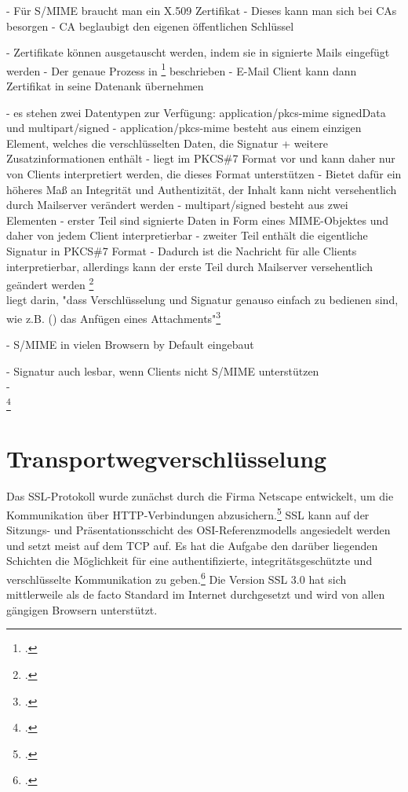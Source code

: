 \documentclass  [paper=a4,
				fontsize=12pt,
				listof=totoc,
				bibliography=totoc
				]{scrreprt}
\begin{document}
				- Für S/MIME braucht man ein X.509 Zertifikat
				- Dieses kann man sich bei CAs besorgen
				- CA beglaubigt den eigenen öffentlichen Schlüssel
				
				- Zertifikate können ausgetauscht werden, indem sie in signierte Mails eingefügt werden
				- Der genaue Prozess in 	\footcite[][S. 65 ff.]{Schwenk} beschrieben
				- E-Mail Client kann dann Zertifikat in seine Datenank übernehmen
				
				- es stehen zwei Datentypen zur Verfügung: application/pkcs-mime signedData und multipart/signed
				- application/pkcs-mime besteht aus einem einzigen Element, welches die verschlüsselten Daten, die Signatur + weitere Zusatzinformationen enthält
				- liegt im PKCS\#7 Format vor und kann daher nur von Clients interpretiert werden, die dieses Format unterstützen
				- Bietet dafür ein höheres Maß an Integrität und Authentizität, der Inhalt kann nicht versehentlich durch Mailserver verändert werden
				- multipart/signed besteht aus zwei Elementen
				- erster Teil sind signierte Daten in Form eines MIME-Objektes und daher von jedem Client interpretierbar
				- zweiter Teil enthält die eigentliche Signatur in PKCS\#7 Format
				- Dadurch ist die Nachricht für alle Clients interpretierbar, allerdings kann der erste Teil durch Mailserver versehentlich geändert werden
				\footcite[][S. 65]{Schwenk}
				\medskip\\											
				liegt darin, "dass Verschlüsselung und Signatur genauso einfach zu bedienen sind, wie z.B. () das Anfügen eines Attachments"\footcite[][S. 61]{Schwenk}
				
				- S/MIME in vielen Browsern by Default eingebaut
				
				- Signatur auch lesbar, wenn Clients nicht S/MIME unterstützen\medskip\\	
				- \medskip\\
						
				\footcite[][S. 40]{Schwenk}
			
			
		\newpage
		\section{Transportwegverschlüsselung}
			Das \ac{SSL}-Protokoll wurde zunächst durch die Firma Netscape entwickelt, um die Kommunikation über \ac{HTTP}-Verbindungen abzusichern.\footcite[Vgl.][S. 796]{Eckert2013} \ac{SSL} kann auf der Sitzungs- und Präsentationsschicht des \ac{OSI}-Referenzmodells angesiedelt werden und setzt meist auf dem \ac{TCP} auf. Es hat die Aufgabe den darüber liegenden Schichten die Möglichkeit für eine authentifizierte, integritätsgeschützte und verschlüsselte Kommunikation zu geben.\footcite[Vgl.][S. 799 ff.]{Eckert2013}
			Die Version \ac{SSL} 3.0 hat sich mittlerweile als de facto Standard im Internet durchgesetzt und wird von allen gängigen Browsern unterstützt.\\
		
\end{document}
